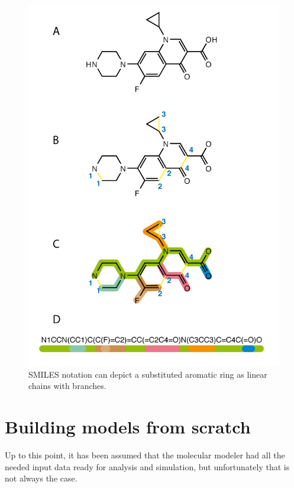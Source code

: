 \begin{figure}[H]
	\begin{center}
	\includegraphics[height=0.9\textheight]{./figures/02/smiles.png}
	\end{center}
	\cprotect\caption[SMILES notation]{SMILES notation can depict a substituted aromatic ring as linear chains with branches.}
	\label{fig:smiles}
\end{figure}

\section{Building models from scratch}
\label{section:buildingmodels}
Up to this point, it has been assumed that the molecular modeler had all the needed input data ready for analysis and simulation, but unfortunately that is not always the case.

